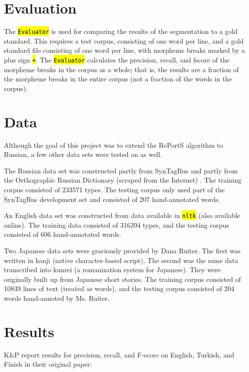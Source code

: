 \documentclass[paper=a4, fontsize=11pt]{article}
\newcommand{\hlc}[1]{\texttt{\hl{#1}}}
\begin{document}
\section{Evaluation}

The \hlc{Evaluator} is used for comparing the results of the segmentation to a gold standard. This requires a test corpus, consisting of one word per line, and a gold standard file consisting of one word per line, with morpheme breaks marked by a plus sign \hlc{+}. The \hlc{Evaluator} calculates the precision, recall, and fscore of the morpheme breaks in the corpus as a whole; that is, the results are a fraction of the morpheme breaks in the entire corpus (not a fraction of the words in the corpus).

\section{Data}

Although the goal of this project was to extend the RePortS algorithm to Russian, a few other data sets were tested on as well. 

The Russian data set was constructed partly from SynTagRus \cite{syntagrus} and partly from the Orthographic Russian Dictionary (scraped from the Internet) \cite{ortho}. The training corpus consisted of 233571 types. The testing corpus only used part of the SynTagRus development set and consisted of 207 hand-annotated words. 

An English data set was constructed from data available in \hlc{nltk} (also available online). \cite{words1932} \cite{conll2000} \cite{cmudict} The training data consisted of 316394 types, and the testing corpus consisted of 606 hand-annotated words.
 
Two Japanese data sets were graciously provided by Dana Ruiter. The first was written in kanji (native character-based script). The second was the same data transcribed into kunrei (a romanization system for Japanese). They were originally built up from Japanese short stories. \cite{aozora} The training corpus consisted of 10839 lines of text (treated as words), and the testing corpus consisted of 204 words hand-annoted by Ms. Ruiter. 

\section{Results}

K\&P report results for precision, recall, and F-score on English, Turkish, and Finish in their original paper:
\end{document}
